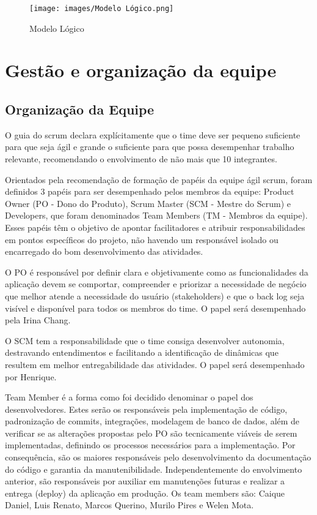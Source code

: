 \documentclass[
    12pt,               %
    openright,          %
    oneside,
    a4paper,            %
    BIBLATEX,           %
    TODO,               %
    english,            %
    brazil              %
    ]{ifsp-spo-inf-ctds}
\begin{document}
            \begin{figure}[H]
                \centering
                \texttt{[image: images/Modelo Lógico.png]}
                \caption{Modelo Lógico}
                \label{fig:DER}
            \end{figure}

    \section{Gestão e organização da equipe}

        \subsection{Organização da Equipe}
            
            O guia do scrum declara explícitamente que o time deve ser pequeno suficiente para que seja ágil e grande o suficiente para que possa desempenhar trabalho relevante, recomendando o envolvimento de não mais que 10 integrantes.\cite{scrum2}
            
            Orientados pela recomendação de formação de papéis da equipe ágil scrum, foram definidos 3 papéis para ser desempenhado pelos membros da equipe: Product Owner (PO -  Dono do Produto), Scrum Master (SCM - Mestre do Scrum) e Developers, que foram denominados Team Members (TM - Membros da equipe). Esses papéis têm o objetivo de apontar facilitadores e atribuir responsabilidades em pontos específicos do projeto, não havendo um responsável isolado ou encarregado do bom desenvolvimento das atividades.\cite{scrum2} \cite{agile2}
            
            O PO é responsável por definir clara e objetivamente como as funcionalidades da aplicação devem se comportar, compreender e priorizar a necessidade de negócio que melhor atende a necessidade do usuário (stakeholders) e que o back log seja visível e disponível para todos os membros do time.\cite{agile2} O papel será desempenhado pela Irina Chang.
            
            O SCM tem a responsabilidade que o time consiga desenvolver autonomia, destravando entendimentos e facilitando a identificação de dinâmicas que resultem em melhor entregabilidade das atividades.\cite{agile2} O papel será desempenhado por Henrique.
            
            Team Member é a forma como foi decidido denominar o papel dos desenvolvedores. Estes serão os responsáveis pela implementação de código, padronização de commits, integrações, modelagem de banco de dados, além de verificar se as alterações propostas pelo PO são tecnicamente viáveis de serem implementadas, definindo os processos necessários para a implementação. Por consequência, são os maiores responsáveis pelo desenvolvimento da documentação do código e garantia da manutenibilidade. Independentemente do envolvimento anterior, são responsáveis por auxiliar em  manutenções futuras e realizar a entrega (deploy) da aplicação em produção.\cite{scrum2} Os team members são: Caique Daniel, Luis Renato, Marcos Querino, Murilo Pires e Welen Mota.
            
\end{document}
